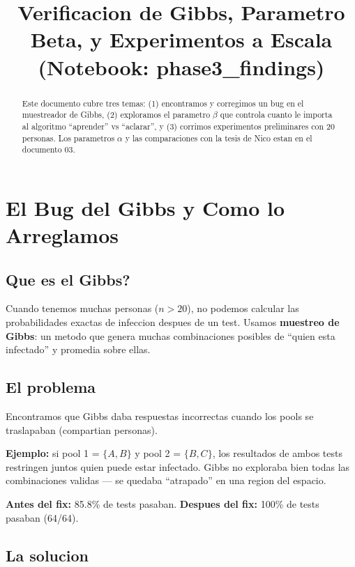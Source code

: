 \documentclass[11pt]{article}
\title{Verificacion de Gibbs, Parametro Beta, y Experimentos a Escala\\
\large (Notebook: phase3\_findings)}
\author{}
\date{}
\begin{document}
\maketitle

\begin{abstract}
Este documento cubre tres temas:
(1) encontramos y corregimos un bug en el muestreador de Gibbs,
(2) exploramos el parametro $\beta$ que controla cuanto le importa
al algoritmo ``aprender'' vs ``aclarar'', y
(3) corrimos experimentos preliminares con 20 personas.
Los parametros $\alpha$ y las comparaciones con la tesis de Nico
estan en el documento 03.
\end{abstract}

\section{El Bug del Gibbs y Como lo Arreglamos}

\subsection{Que es el Gibbs?}

Cuando tenemos muchas personas ($n > 20$), no podemos calcular las
probabilidades exactas de infeccion despues de un test.
Usamos \textbf{muestreo de Gibbs}: un metodo que genera muchas
combinaciones posibles de ``quien esta infectado'' y promedia sobre ellas.

\subsection{El problema}

Encontramos que Gibbs daba respuestas incorrectas cuando los pools
se traslapaban (compartian personas).

\textbf{Ejemplo:} si pool 1 = $\{A, B\}$ y pool 2 = $\{B, C\}$,
los resultados de ambos tests restringen juntos quien puede estar infectado.
Gibbs no exploraba bien todas las combinaciones validas --- se quedaba
``atrapado'' en una region del espacio.

\textbf{Antes del fix:} 85.8\% de tests pasaban.
\textbf{Despues del fix:} 100\% de tests pasaban (64/64).

\subsection{La solucion}
\end{document}

